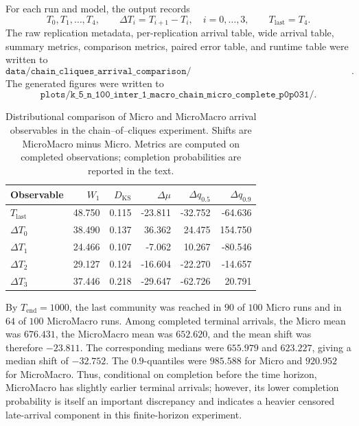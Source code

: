 \documentclass[12pt]{article}
\begin{document}
For each run and model, the output records
\[
T_0,T_1,\ldots,T_4,\qquad
\Delta T_i=T_{i+1}-T_i,\quad i=0,\ldots,3,
\qquad
T_{\mathrm{last}}=T_4.
\]
The raw replication metadata, per-replication arrival table, wide arrival table, summary metrics, comparison metrics, paired error table, and runtime table were written to
\[
\texttt{data/chain\_cliques\_arrival\_comparison/chain\_L5\_n100\_k1\_beta0p005\_paper\_100reps/}.
\]
The generated figures were written to
\[
\texttt{plots/k\_5\_n\_100\_inter\_1\_macro\_chain\_micro\_complete\_p0p031/}.
\]

\begin{table}[t]
    \centering
    \begin{tabular}{lrrrrr}
        \hline
        Observable & \(W_1\) & \(D_{\mathrm{KS}}\) & \(\Delta\mu\) & \(\Delta q_{0.5}\) & \(\Delta q_{0.9}\) \\
        \hline
        \(T_{\mathrm{last}}\) & 48.750 & 0.115 & -23.811 & -32.752 & -64.636 \\
        \(\Delta T_0\) & 38.490 & 0.137 & 36.362 & 24.475 & 154.750 \\
        \(\Delta T_1\) & 24.466 & 0.107 & -7.062 & 10.267 & -80.546 \\
        \(\Delta T_2\) & 29.127 & 0.124 & -16.604 & -22.270 & -14.657 \\
        \(\Delta T_3\) & 37.446 & 0.218 & -29.647 & -62.726 & 20.791 \\
        \hline
    \end{tabular}
    \caption{Distributional comparison of Micro and MicroMacro arrival observables in the chain--of--cliques experiment. Shifts are MicroMacro minus Micro. Metrics are computed on completed observations; completion probabilities are reported in the text.}
    \label{tab:chain_cliques_arrival_metrics}
\end{table}

By \(T_{\mathrm{end}}=1000\), the last community was reached in \(90\) of \(100\) Micro runs and in \(64\) of \(100\) MicroMacro runs. Among completed terminal arrivals, the Micro mean was \(676.431\), the MicroMacro mean was \(652.620\), and the mean shift was therefore \(-23.811\). The corresponding medians were \(655.979\) and \(623.227\), giving a median shift of \(-32.752\). The \(0.9\)-quantiles were \(985.588\) for Micro and \(920.952\) for MicroMacro. Thus, conditional on completion before the time horizon, MicroMacro has slightly earlier terminal arrivals; however, its lower completion probability is itself an important discrepancy and indicates a heavier censored late-arrival component in this finite-horizon experiment.
\end{document}
